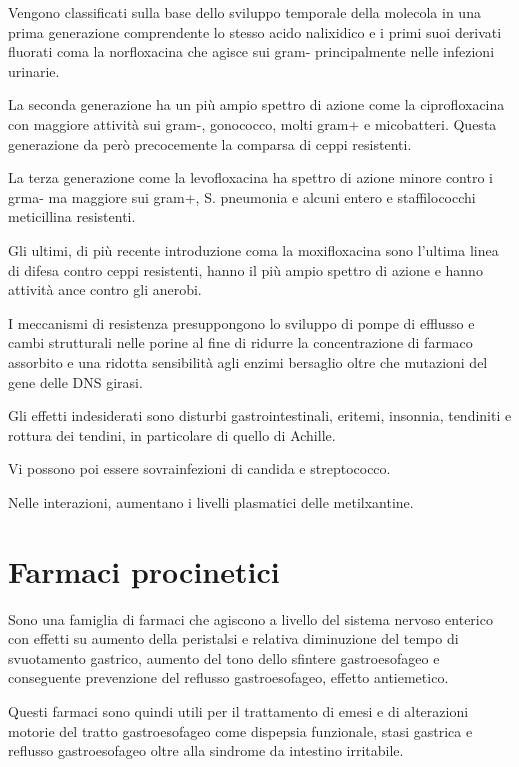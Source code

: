 Vengono classificati sulla base dello sviluppo temporale della molecola in una prima generazione comprendente lo stesso acido nalixidico e i primi suoi derivati fluorati coma la norfloxacina che agisce sui gram- principalmente nelle infezioni urinarie.

La seconda generazione ha un più ampio spettro di azione come la ciprofloxacina con maggiore attività sui gram-, gonococco, molti gram+ e micobatteri. Questa generazione da però precocemente la comparsa di ceppi resistenti.

La terza generazione come la levofloxacina ha spettro di azione minore contro i grma- ma maggiore sui gram+, S. pneumonia e alcuni entero e staffilococchi meticillina resistenti.

Gli ultimi, di più recente introduzione coma la moxifloxacina sono l'ultima linea di difesa contro ceppi resistenti, hanno il più ampio spettro di azione e hanno attività ance contro gli anerobi.

I meccanismi di resistenza presuppongono lo sviluppo di pompe di efflusso e cambi strutturali nelle porine al fine di ridurre la concentrazione di farmaco assorbito e una ridotta sensibilità agli enzimi bersaglio oltre che mutazioni del gene delle DNS girasi.

Gli effetti indesiderati sono disturbi gastrointestinali, eritemi, insonnia, tendiniti e rottura dei tendini, in particolare di quello di Achille. 

Vi possono poi essere sovrainfezioni di candida e streptococco.

Nelle interazioni, aumentano i livelli plasmatici delle metilxantine.

\section{Farmaci procinetici}

Sono una famiglia di farmaci che agiscono a livello del sistema nervoso enterico con effetti su aumento della peristalsi e relativa diminuzione del tempo di svuotamento gastrico, aumento del tono dello sfintere gastroesofageo e conseguente prevenzione del reflusso gastroesofageo, effetto antiemetico.

Questi farmaci sono quindi utili per il trattamento di emesi e di alterazioni motorie del tratto  gastroesofageo come dispepsia funzionale, stasi gastrica e reflusso gastroesofageo oltre alla sindrome da intestino irritabile.

